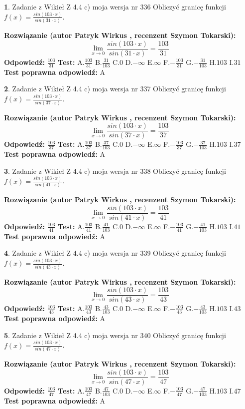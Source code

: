\documentclass[12pt, a4paper]{article}
\theoremstyle{definition} %
\newtheorem{zad}{}
\newcommand{\zadStart}[1]{\begin{zad}#1\newline}
\newcommand{\zadStop}{\end{zad}}
\newcommand{\rozwStart}[2]{\noindent \textbf{Rozwiązanie (autor #1 , recenzent #2): }\newline}
\newcommand{\rozwStop}{\newline}
\newcommand{\odpStart}{\noindent \textbf{Odpowiedź:}\newline}
\newcommand{\odpStop}{\newline}
\newcommand{\testStart}{\noindent \textbf{Test:}\newline}
\newcommand{\testStop}{\newline}
\newcommand{\kluczStart}{\noindent \textbf{Test poprawna odpowiedź:}\newline}
\newcommand{\kluczStop}{\newline}
\begin{document}
\zadStart{Zadanie z Wikieł Z 4.4 c) moja wersja nr 336}
Obliczyć granicę funkcji $f(x)=\frac{sin(103\cdot x)}{sin(31\cdot x)}$.
\zadStop
\rozwStart{Patryk Wirkus}{Szymon Tokarski}
$$\lim\limits_{x\to 0}\frac{sin(103\cdot x)}{sin(31\cdot x)}=
\frac{103}{31}$$
\rozwStop
\odpStart
$\frac{103}{31}$
\odpStop
\testStart
A.$\frac{103}{31}$
B.$\frac{31}{103}$
C.$0$
D.$-\infty$
E.$\infty$
F.$-\frac{103}{31}$
G.$-\frac{31}{103}$
H.$103$
I.$31$
\testStop
\kluczStart
A
\kluczStop



\zadStart{Zadanie z Wikieł Z 4.4 c) moja wersja nr 337}
Obliczyć granicę funkcji $f(x)=\frac{sin(103\cdot x)}{sin(37\cdot x)}$.
\zadStop
\rozwStart{Patryk Wirkus}{Szymon Tokarski}
$$\lim\limits_{x\to 0}\frac{sin(103\cdot x)}{sin(37\cdot x)}=
\frac{103}{37}$$
\rozwStop
\odpStart
$\frac{103}{37}$
\odpStop
\testStart
A.$\frac{103}{37}$
B.$\frac{37}{103}$
C.$0$
D.$-\infty$
E.$\infty$
F.$-\frac{103}{37}$
G.$-\frac{37}{103}$
H.$103$
I.$37$
\testStop
\kluczStart
A
\kluczStop



\zadStart{Zadanie z Wikieł Z 4.4 c) moja wersja nr 338}
Obliczyć granicę funkcji $f(x)=\frac{sin(103\cdot x)}{sin(41\cdot x)}$.
\zadStop
\rozwStart{Patryk Wirkus}{Szymon Tokarski}
$$\lim\limits_{x\to 0}\frac{sin(103\cdot x)}{sin(41\cdot x)}=
\frac{103}{41}$$
\rozwStop
\odpStart
$\frac{103}{41}$
\odpStop
\testStart
A.$\frac{103}{41}$
B.$\frac{41}{103}$
C.$0$
D.$-\infty$
E.$\infty$
F.$-\frac{103}{41}$
G.$-\frac{41}{103}$
H.$103$
I.$41$
\testStop
\kluczStart
A
\kluczStop



\zadStart{Zadanie z Wikieł Z 4.4 c) moja wersja nr 339}
Obliczyć granicę funkcji $f(x)=\frac{sin(103\cdot x)}{sin(43\cdot x)}$.
\zadStop
\rozwStart{Patryk Wirkus}{Szymon Tokarski}
$$\lim\limits_{x\to 0}\frac{sin(103\cdot x)}{sin(43\cdot x)}=
\frac{103}{43}$$
\rozwStop
\odpStart
$\frac{103}{43}$
\odpStop
\testStart
A.$\frac{103}{43}$
B.$\frac{43}{103}$
C.$0$
D.$-\infty$
E.$\infty$
F.$-\frac{103}{43}$
G.$-\frac{43}{103}$
H.$103$
I.$43$
\testStop
\kluczStart
A
\kluczStop



\zadStart{Zadanie z Wikieł Z 4.4 c) moja wersja nr 340}
Obliczyć granicę funkcji $f(x)=\frac{sin(103\cdot x)}{sin(47\cdot x)}$.
\zadStop
\rozwStart{Patryk Wirkus}{Szymon Tokarski}
$$\lim\limits_{x\to 0}\frac{sin(103\cdot x)}{sin(47\cdot x)}=
\frac{103}{47}$$
\rozwStop
\odpStart
$\frac{103}{47}$
\odpStop
\testStart
A.$\frac{103}{47}$
B.$\frac{47}{103}$
C.$0$
D.$-\infty$
E.$\infty$
F.$-\frac{103}{47}$
G.$-\frac{47}{103}$
H.$103$
I.$47$
\testStop
\kluczStart
A
\kluczStop
\end{document}
